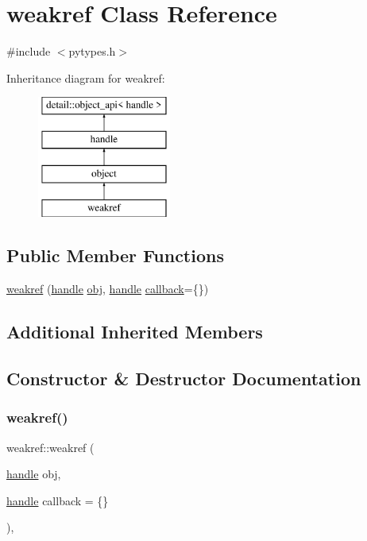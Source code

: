 \hypertarget{classweakref}{}\section{weakref Class Reference}
\label{classweakref}


{\ttfamily \#include $<$pytypes.\+h$>$}

Inheritance diagram for weakref\+:\begin{figure}[H]
\begin{center}
\leavevmode
\includegraphics[height=4.000000cm]{classweakref}
\end{center}
\end{figure}
\subsection*{Public Member Functions}
\begin{DoxyCompactItemize}
\item 
\mbox{\hyperlink{classweakref_ac2ed6fcb41b9cb6257105976ff397ce1}{weakref}} (\mbox{\hyperlink{classhandle}{handle}} \mbox{\hyperlink{_s_d_l__opengl__glext_8h_a0c0d4701a6c89f4f7f0640715d27ab26}{obj}}, \mbox{\hyperlink{classhandle}{handle}} \mbox{\hyperlink{weakrefobject_8h_adec875b7d7d5b29e2741082daf99dde9}{callback}}=\{\})
\end{DoxyCompactItemize}
\subsection*{Additional Inherited Members}


\subsection{Constructor \& Destructor Documentation}
\mbox{\label{classweakref_ac2ed6fcb41b9cb6257105976ff397ce1}} 
\subsubsection{\texorpdfstring{weakref()}{weakref()}}
{\footnotesize\ttfamily weakref\+::weakref (\begin{DoxyParamCaption}\item[{\mbox{\hyperlink{classhandle}{handle}}}]{obj,  }\item[{\mbox{\hyperlink{classhandle}{handle}}}]{callback = {\ttfamily \{\}} }\end{DoxyParamCaption})\hspace{0.3cm}{\ttfamily [inline]}, {\ttfamily [explicit]}}



